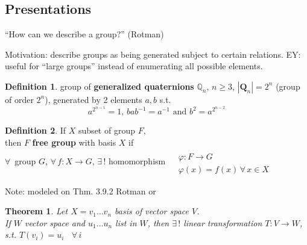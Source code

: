 \documentclass[twoside,landscape]{amsart}
\theoremstyle{plain}
\newtheorem{theorem}{Theorem}
\theoremstyle{definition}
\newtheorem{definition}{Definition}
\theoremstyle{remark}
\begin{document}
\begin{multicols*}{2}
\subsection{}

\subsection{Presentations}

``How can we describe a group?'' (Rotman)

Motivation: describe groups as being generated subject to certain relations.  EY: useful for ``large groups'' instead of enumerating all possible elements.  

\begin{definition}
  group of \textbf{generalized quaternions} $\mathbb{Q}_n$, $n\geq 3$, $|\mathbf{Q}_n|=2^n$ (group of order $2^n$), generated by 2 elements $a,b$ s.t. 
\[
a^{2^{n-1}} = 1, \, bab^{-1} = a^{-1} \text{ and } b^2 = a^{2^{n-2}}
\]
\end{definition}

\begin{definition}
If $X$ subset of group $F$, \\
then $F$ \textbf{free group} with basis $X$ if  \\
$\forall \, $ group $G$, $\forall \, f: X \to G$, $\exists \, !$ homomorphism $\begin{aligned} & \quad \\
  & \varphi : F \to G \\
  & \varphi(x) = f(x) \, \forall \, x \in X \end{aligned}$


\end{definition}

Note: modeled on Thm. 3.9.2 Rotman or 


\begin{theorem}
  Let $X=v_1 \dots v_n$ basis of vector space $V$.   \\
If $W$ vector space and $u_1 \dots u_n$ list in $W$, then $\exists \, !$ linear transformation $T:V\to W$, s.t. $T(v_i)=u_i $ \quad \, $\forall \, i$


\end{theorem}
\end{multicols*}
\end{document}

